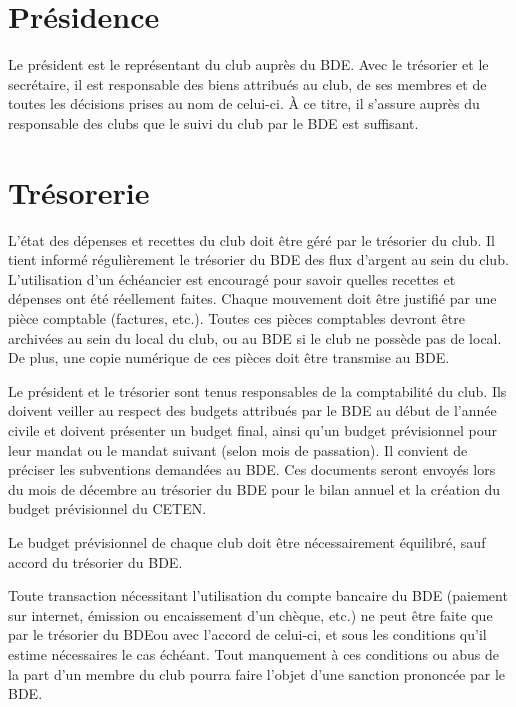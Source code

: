 \documentclass{article}
\begin{document}
\begin{multicols}{2}
{		}

		\section{Présidence}
\label{sec:presidence}

		{\small

			Le président est le représentant du club auprès du BDE\@. Avec le
			trésorier et le secrétaire, il est responsable des biens attribués
			au club, de ses membres et de toutes les décisions prises au nom de
			celui-ci. À ce titre, il s'assure auprès du responsable des clubs
			que le suivi du club par le BDE est suffisant. 

		}

		\section{Trésorerie}
\label{sec:tresorerie}

		{\small
		
			L’état des dépenses et recettes du club doit être géré par le
			trésorier du club. Il tient informé régulièrement le trésorier du
			BDE des flux d’argent au sein du club. L’utilisation d’un échéancier
			est encouragé pour savoir quelles recettes et dépenses ont été
			réellement faites. Chaque mouvement doit être justifié par une pièce
			comptable (factures, etc.). Toutes ces pièces comptables devront
			être archivées au sein du local du club, ou au BDE si le club ne
			possède pas de local. De plus, une copie numérique de ces pièces
			doit être transmise au BDE\@.

			Le président et le trésorier sont tenus responsables de la
			comptabilité du club. Ils doivent veiller au respect des budgets
			attribués par le BDE au début de l’année civile et doivent présenter
			un budget final, ainsi qu’un budget prévisionnel pour leur mandat ou
			le mandat suivant (selon mois de passation). Il convient de préciser
			les subventions demandées au BDE\@. Ces documents seront envoyés
			lors du mois de décembre au trésorier du BDE pour le bilan annuel et
			la création du budget prévisionnel du CETEN\@.

			Le budget prévisionnel de chaque club doit être nécessairement
			équilibré, sauf accord du trésorier du BDE\@.

			Toute transaction nécessitant l’utilisation du compte bancaire du
			BDE (paiement sur internet, émission ou encaissement d’un chèque,
			etc.) ne peut être faite que par le trésorier du BDE\@ ou avec
			l'accord de celui-ci, et sous les conditions qu'il estime
			nécessaires le cas échéant. Tout manquement à ces conditions ou abus
			de la part d'un membre du club pourra faire l'objet d'une sanction
			prononcée par le BDE\@.

}
\end{multicols}
\end{document}
